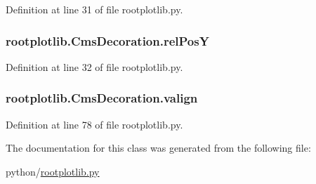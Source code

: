 Definition at line 31 of file rootplotlib.\-py.

\subsubsection[{rel\-Pos\-Y}]{\setlength{\rightskip}{0pt plus 5cm}rootplotlib.\-Cms\-Decoration.\-rel\-Pos\-Y}\label{classrootplotlib_1_1CmsDecoration_a4d3ae76361a206d7bcbed674fb84ea74}


Definition at line 32 of file rootplotlib.\-py.

\subsubsection[{valign}]{\setlength{\rightskip}{0pt plus 5cm}rootplotlib.\-Cms\-Decoration.\-valign}\label{classrootplotlib_1_1CmsDecoration_a0015ddd82a36db72573e0aae56f26cbb}


Definition at line 78 of file rootplotlib.\-py.



The documentation for this class was generated from the following file\-:\begin{DoxyCompactItemize}
\item 
python/\hyperlink{rootplotlib_8py}{rootplotlib.\-py}\end{DoxyCompactItemize}
